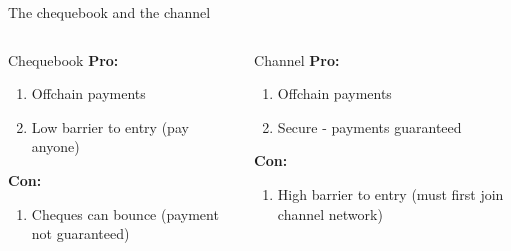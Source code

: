 \begin{frame}{The chequebook and the channel}
\begin{overlayarea}{\textwidth}{5.2cm}
\begin{columns}[t]
    \begin{block}{Chequebook}
      \textbf{Pro:}
      \begin{enumerate}
       \item<1>{Offchain payments}
       \item<2>{Low barrier to entry (pay anyone)}
      \end{enumerate}
      \textbf{Con:}
      \begin{enumerate}
       \item<3>{Cheques can bounce (payment not guaranteed)}
      \end{enumerate}
    \end{block}
    \begin{block}{Channel}
      \textbf{Pro:}
      \begin{enumerate}
       \item<1>{Offchain payments}
       \item<3>{Secure - payments guaranteed}
      \end{enumerate}
      \textbf{Con:}
      \begin{enumerate}
       \item<2>{High barrier to entry (must first join channel network)}
      \end{enumerate}     
    \end{block}
\end{columns}
\end{overlayarea}
\end{frame}


